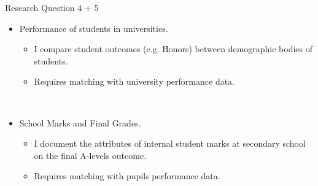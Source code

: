 \begin{frame}{Research Question 4 + 5}
    \begin{itemize}
        \item Performance of students in universities.
        \begin{itemize}
            \item I compare student outcomes (e.g. Honors) between demographic bodies of students.

            \item Requires matching with university performance data.
        \end{itemize}

        \

        \item School Marks and Final Grades.
        \begin{itemize}
            \item I document the attributes of internal student marks at secondary school on the final A-levels outcome.

            \item Requires matching with pupils performance data.
        \end{itemize}

    \end{itemize}
\end{frame}
